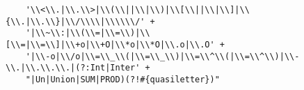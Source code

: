 \begin{lstlisting}
    '\\<\\.|\\.\\>|\\(\\||\\|\\)|\\[\\||\\|\\]|\\{\\.|\\.\\}|\\/\\\\|\\\\\\/' +
    '|\\~\\:|\\(\\=|\\=\\)|\\[\\=|\\=\\]|\\+o|\\+O|\\*o|\\*O|\\.o|\\.O' +
    '|\\-o|\\/o|\\=\\_\\(|\\=\\_\\)|\\=\\^\\(|\\=\\^\\)|\\-\\.|\\.\\.\\.|(?:Int|Inter' +
    "|Un|Union|SUM|PROD)(?!#{quasiletter})"
\end{lstlisting}

